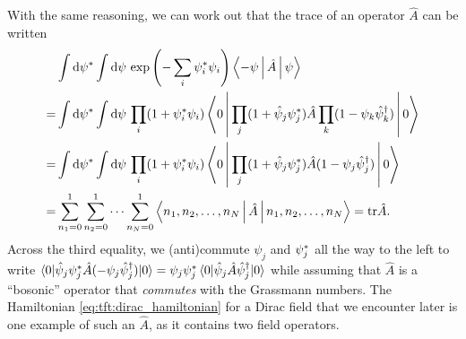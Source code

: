 With the same reasoning, we can work out that the trace of an operator $\hat{A}$ can be written
\begin{equation}
\begin{split}
	 & \int \mathop{}\!\mathrm{d} {\psi}^* \int \mathop{}\!\mathrm{d} \psi \, \exp \left( -\sum_i {\psi}^*_i \psi_i \right) \Braket{-\psi | \hat{A} | \psi} \\
	=& \int \mathop{}\!\mathrm{d} {\psi}^* \int \mathop{}\!\mathrm{d} \psi \, \prod_i (1 + {\psi}^*_i \psi_i) \Braket{0 | \prod_j (1 + \hat\psi_j {\psi}^*_j) \hat{A} \prod_k (1 - \psi_k \hat\psi^\dagger_k) | 0} \\
	=& \int \mathop{}\!\mathrm{d} {\psi}^* \int \mathop{}\!\mathrm{d} \psi \, \prod_i (1 + {\psi}^*_i \psi_i) \Braket{0 | \prod_j (1 + \hat\psi_j {\psi}^*_j) \hat{A} (1 - \psi_j \hat\psi^\dagger_j) | 0} \\
	=& \sum_{n_1=0}^1 \sum_{n_2=0}^1\cdots \sum_{n_N=0}^1 \Braket{n_1, n_2, \ldots, n_N | \hat{A} | n_1, n_2, \ldots, n_N} = \text{tr} \hat{A} . \\
\end{split}
\label{eq:tft:trace_grassmann_discrete}
\end{equation}
Across the third equality, we (anti)commute $\psi_j$ and ${\psi}^*_j$ all the way to the left to write $\braket{0 | \hat\psi_j {\psi}^*_j \hat{A} (-\psi_j \hat\psi^\dagger_j) | 0} = \psi_j {\psi}^*_j \braket{0 | \hat\psi_j \hat{A} \hat\psi^\dagger_j | 0}$ while assuming that $\hat{A}$ is a ``bosonic'' operator that \emph{commutes} with the Grassmann numbers.
The Hamiltonian \eqref{eq:tft:dirac_hamiltonian} for a Dirac field that we encounter later is one example of such an $\hat{A}$, as it contains two field operators.

